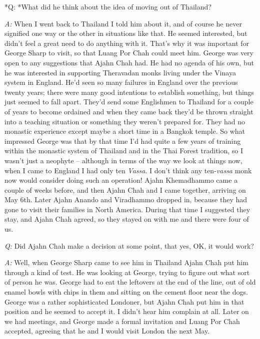 *Q: *What did he think about the idea of moving out of Thailand? 

\emph{A:} When I went back to Thailand I told him about it, and of
course he never signified one way or the other in situations like that. 
He seemed interested, but didn't feel a great need to do anything with
it. That's why it was important for George Sharp to visit, so that Luang
Por Chah could meet him. George was very open to any suggestions that
Ajahn Chah had. He had no agenda of his own, but he was interested in
supporting Theravadan monks living under the Vinaya system in England. 
He'd seen so many failures in England over the previous twenty years; 
there were many good intentions to establish something, but things just
seemed to fall apart. They'd send some Englishmen to Thailand for a
couple of years to become ordained and when they came back they'd be
thrown straight into a teaching situation or something they weren't
prepared for. They had no monastic experience except maybe a short time
in a Bangkok temple. So what impressed George was that by that time I'd
had quite a few years of training within the monastic system of Thailand
and in the Thai Forest tradition, so I wasn't just a neophyte --
although in terms of the way we look at things now, when I came to
England I had only ten \emph{Vassa}. I don't think any ten-\emph{vassa}
monk now would consider doing such an operation! Ajahn Khemadhammo came
a couple of weeks before, and then Ajahn Chah and I came together, 
arriving on May 6th. Later Ajahn Anando and Viradhammo dropped in, 
because they had gone to visit their families in North America. During
that time I suggested they stay, and Ajahn Chah agreed, so they stayed
on with me and there were four of us. 

\emph{Q:} Did Ajahn Chah make a decision at some point, that yes, OK, it
would work? 

\emph{A:} Well, when George Sharp came to see him in Thailand Ajahn Chah
put him through a kind of test. He was looking at George, trying to
figure out what sort of person he was. George had to eat the leftovers
at the end of the line, out of old enamel bowls with chips in them and
sitting on the cement floor near the dogs. George was a rather
sophisticated Londoner, but Ajahn Chah put him in that position and he
seemed to accept it. I didn't hear him complain at all. Later on we had
meetings, and George made a formal invitation and Luang Por Chah
accepted, agreeing that he and I would visit London the next May. 

